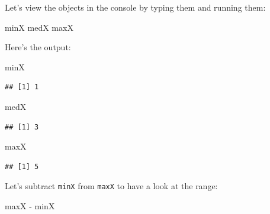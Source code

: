 \documentclass[]{tufte-handout}
\newenvironment{Shaded}{}{}
\newcommand{\KeywordTok}[1]{\textcolor[rgb]{0.00,0.44,0.13}{\textbf{#1}}}
\newcommand{\NormalTok}[1]{#1}
\newcommand{\OperatorTok}[1]{\textcolor[rgb]{0.40,0.40,0.40}{#1}}
\newcommand{\StringTok}[1]{\textcolor[rgb]{0.25,0.44,0.63}{#1}}
\begin{document}
\begin{Shaded}
\end{Shaded}

Let's view the objects in the console by typing them and running them:

\begin{Shaded}
\begin{Highlighting}[]
\NormalTok{minX}
\NormalTok{medX}
\NormalTok{maxX}
\end{Highlighting}
\end{Shaded}

Here's the output:

\begin{Shaded}
\begin{Highlighting}[]
\NormalTok{minX}
\end{Highlighting}
\end{Shaded}

\begin{verbatim}
## [1] 1
\end{verbatim}

\begin{Shaded}
\begin{Highlighting}[]
\NormalTok{medX}
\end{Highlighting}
\end{Shaded}

\begin{verbatim}
## [1] 3
\end{verbatim}

\begin{Shaded}
\begin{Highlighting}[]
\NormalTok{maxX}
\end{Highlighting}
\end{Shaded}

\begin{verbatim}
## [1] 5
\end{verbatim}

Let's subtract \texttt{minX} from \texttt{maxX} to have a look at the
range:

\begin{Shaded}
\begin{Highlighting}[]
\NormalTok{maxX }\OperatorTok{-}\StringTok{ }\NormalTok{minX}
\end{Highlighting}
\end{Shaded}
\end{document}
